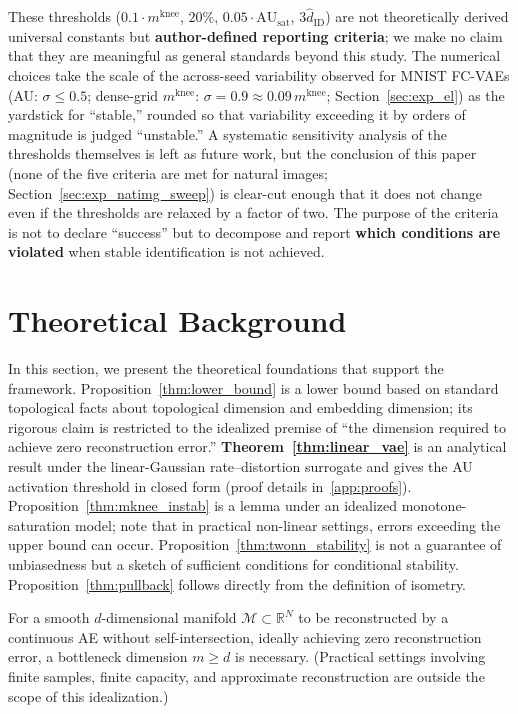 \documentclass[make,article,submit,pdftex,moreauthors]{Definitions/mdpi}
\newcommand{\R}{\mathbb{R}}
\newcommand{\AUsat}{\mathrm{AU}_{\mathrm{sat}}}
\newcommand{\mknee}{m^{\mathrm{knee}}}
\begin{document}
These thresholds ($0.1\cdot\mknee$, $20\%$, $0.05\cdot\AUsat$,
$3\hat{d}_\mathrm{ID}$) are not theoretically derived universal constants but
\textbf{author-defined reporting criteria}; we make no claim that they are
meaningful as general standards beyond this study.
The numerical choices take the scale of the across-seed variability observed for
MNIST FC-VAEs (AU: $\sigma \leq 0.5$; dense-grid $\mknee$:
$\sigma = 0.9 \approx 0.09\,\mknee$; Section~\ref{sec:exp_el}) as the yardstick
for ``stable,'' rounded so that variability exceeding it by orders of magnitude is
judged ``unstable.''
A systematic sensitivity analysis of the thresholds themselves is left as future
work, but the conclusion of this paper (none of the five criteria are met for
natural images; Section~\ref{sec:exp_natimg_sweep}) is clear-cut enough that it
does not change even if the thresholds are relaxed by a factor of two.
The purpose of the criteria is not to declare ``success'' but to decompose and
report \textbf{which conditions are violated} when stable identification is not
achieved.

\section{Theoretical Background}\label{sec:theory}

In this section, we present the theoretical foundations that support the framework.
Proposition~\ref{thm:lower_bound} is a lower bound based on standard topological facts
about topological dimension and embedding dimension; its rigorous claim is restricted to
the idealized premise of ``the dimension required to achieve zero reconstruction error.''
\textbf{Theorem~\ref{thm:linear_vae}} is an analytical result under the linear-Gaussian
rate--distortion surrogate and gives the AU activation threshold in closed form
(proof details in~\ref{app:proofs}).
Proposition~\ref{thm:mknee_instab} is a lemma under an idealized monotone-saturation model;
note that in practical non-linear settings, errors exceeding the upper bound can occur.
Proposition~\ref{thm:twonn_stability} is not a guarantee of unbiasedness but a sketch of
sufficient conditions for conditional stability.
Proposition~\ref{thm:pullback} follows directly from the definition of isometry.

\begin{Proposition}\label{thm:lower_bound}
For a smooth $d$-dimensional manifold $\mathcal{M} \subset \R^N$ to be reconstructed by
a continuous AE without self-intersection, ideally achieving zero reconstruction error,
a bottleneck dimension $m \geq d$ is necessary.
(Practical settings involving finite samples, finite capacity, and approximate
reconstruction are outside the scope of this idealization.)
\end{Proposition}
\end{document}
